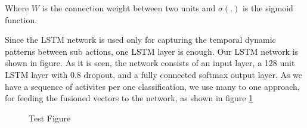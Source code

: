 Where $W$ is the connection weight between two units and $\sigma(.)$ is the sigmoid function.

Since the LSTM network is used only for capturing the temporal dynamic patterns between sub actions, one LSTM layer is enough.
Our LSTM network is shown in figure. As it is seen, the network consists of an input layer, a 128 unit LSTM layer with 0.8 dropout, and
a fully connected softmax output layer. As we have a sequence of activites per one classification, we use many to one approach,
for feeding the fusioned vectors to the network, as shown in figure \ref{fi:lstm}

\begin{figure}
  \centering
  
  \caption{Test Figure}\label{fi:lstm}
\end{figure}




